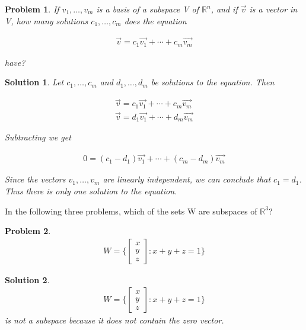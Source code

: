 \documentclass{article}
\newtheorem{problem}{Problem}
\newtheorem*{solution}{Solution}
\begin{document}
\begin{problem}
If $v_{1}, \ldots, v_{m}$ is a basis of a subspace V of $\mathbb{R}^n$, and if $\vec{v}$ is a vector in V, how many solutions $c_{1},\ldots,c_{m}$ does the equation 

\begin{align*}
\vec{v} = c_{1} \vec{v_{1}} + \cdots + c_{m} \vec{v_{m}}
\end{align*}

have?
\end{problem}

\begin{solution}
Let $c_{1},\ldots,c_{m}$ and $d_{1},\ldots,d_{m}$ be solutions to the equation. Then

\begin{align*}
\vec{v} = c_{1} \vec{v_{1}} + \cdots + c_{m} \vec{v_{m}} \\
\vec{v} = d_{1} \vec{v_{1}} + \cdots + d_{m} \vec{v_{m}} 
\end{align*}

Subtracting we get

\begin{align*}
0 = (c_{1} - d_{1}) \vec{v_{1}} + \cdots + (c_{m} - d_{m}) \vec{v_{m}}
\end{align*}

Since the vectors $v_{1}, \ldots, v_{m}$ are linearly independent, we can conclude that $c_{1} = d_{1}$. Thus there is only one solution to the equation. 

\end{solution}

In the following three problems, which of the sets W are subspaces of $\mathbb{R}^3$?

\begin{problem}
\begin{align*}
W = \Bigg \{ \begin{bmatrix} x \\ y \\ z \end{bmatrix} : x + y + z = 1 \Bigg \}
\end{align*}
\end{problem}

\begin{solution}
\begin{align*}
W = \Bigg \{ \begin{bmatrix} x \\ y \\ z \end{bmatrix} : x + y + z = 1 \Bigg \}
\end{align*}
is not a subspace because it does not contain the zero vector.
\end{solution}
\end{document}
